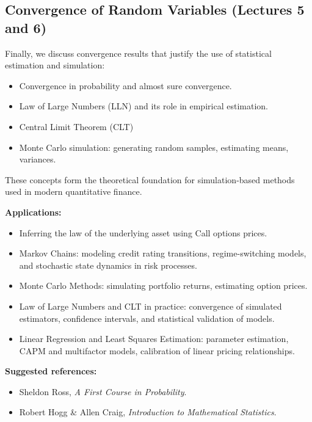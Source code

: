 \documentclass[12pt,a4paper]{article}
\begin{document}
\subsection{Convergence of Random Variables (Lectures 5 and 6)}
Finally, we discuss convergence results that justify the use of statistical estimation and simulation:
\begin{itemize}[itemsep=-4pt, topsep=2pt]
    \item Convergence in probability and almost sure convergence.
    \item Law of Large Numbers (LLN) and its role in empirical estimation.
    \item Central Limit Theorem (CLT)
    \item Monte Carlo simulation: generating random samples, estimating means, variances.
\end{itemize}
These concepts form the theoretical foundation for simulation-based methods used in modern quantitative finance.



\textbf{Applications:}
\begin{itemize}[itemsep=-4pt, topsep=2pt]
    \item Inferring the law of the underlying asset using Call options prices.
    \item Markov Chains: modeling credit rating transitions, regime-switching models, and stochastic state dynamics in risk processes.
    \item Monte Carlo Methods: simulating portfolio returns, estimating option prices.
    \item Law of Large Numbers and CLT in practice: convergence of simulated estimators, confidence intervals, and statistical validation of models.
    \item Linear Regression and Least Squares Estimation: parameter estimation, CAPM and multifactor models, calibration of linear pricing relationships.
\end{itemize}

\textbf{Suggested references:}
\begin{itemize}[itemsep=-4pt, topsep=2pt]
    \item Sheldon Ross, \textit{A First Course in Probability}.
    \item Robert Hogg \& Allen Craig, \textit{Introduction to Mathematical Statistics}.
\end{itemize}
\end{document}
